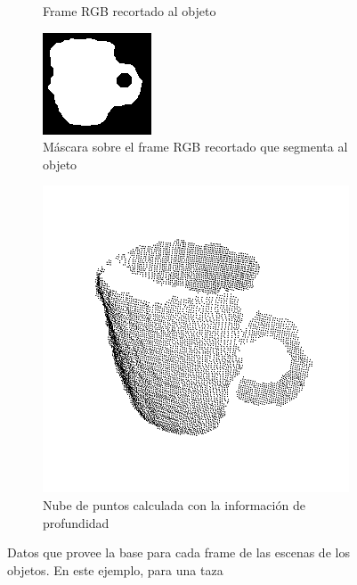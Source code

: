 \begin{figure}
\begin{subfigure}[b]{0.4\textwidth}
        \caption{Frame RGB recortado al objeto}
    \end{subfigure}
    \quad
    \begin{subfigure}[b]{0.4\textwidth}
        \includegraphics[width=\textwidth]{img/base_rgbd/maskcrop.png}
        \caption{Máscara sobre el frame RGB recortado que segmenta al objeto}
    \end{subfigure}
    \quad
    \begin{subfigure}[b]{0.4\textwidth}
        \includegraphics[width=\textwidth]{img/base_rgbd/cloud.png}
        \caption{Nube de puntos calculada con la información de profundidad}
    \end{subfigure}
    \caption{Datos que provee la base para cada frame de las escenas de los objetos. En este ejemplo, para una taza}
    \label{datos_objeto_base}
\end{figure}

